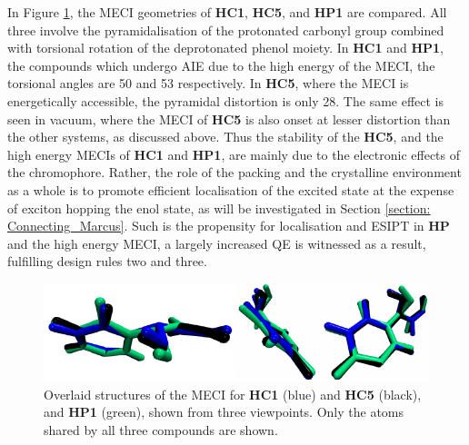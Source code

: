 In Figure \ref{figure: MECI_comparison}, the MECI geometries of \textbf{HC1}, \textbf{HC5}, and \textbf{HP1} are compared. All three involve the pyramidalisation of the protonated carbonyl group  combined with torsional rotation of the deprotonated phenol moiety. In \textbf{HC1} and \textbf{HP1}, the compounds which undergo AIE due to the high energy of the MECI, the torsional angles are 50\degree{} and 53\degree{} respectively. In \textbf{HC5}, where the MECI is energetically accessible, the pyramidal distortion is only 28\degree{}. The same effect is seen in vacuum, where the MECI of \textbf{HC5} is also onset at lesser distortion than the other systems, as discussed above. Thus the stability of the \textbf{HC5}, and the high energy MECIs of \textbf{HC1} and \textbf{HP1}, are mainly due to the electronic effects of the chromophore. Rather, the role of the packing and the crystalline environment as a whole is to promote efficient localisation of the excited state at the expense of exciton hopping the enol state, as will be investigated in Section \ref{section: Connecting_Marcus}. Such is the propensity for localisation and ESIPT in \textbf{HP} and the high energy MECI, a largely increased \ac{QE} is witnessed as a result, fulfilling design rules two and three.
\begin{figure}[t]
\centering
  \includegraphics[width=0.9\linewidth]{5ConnectingCrystalStructure/MECI_comparison.pdf}
  \caption[MECI geometries for \textbf{HC1},\textbf{HC5} \% \textbf{HP1}.]{Overlaid structures of the MECI for \textbf{HC1} (blue) and \textbf{HC5} (black), and \textbf{HP1} (green), shown from three viewpoints. Only the atoms shared by all three compounds are shown.}
  \label{figure: MECI_comparison}
\end{figure}

